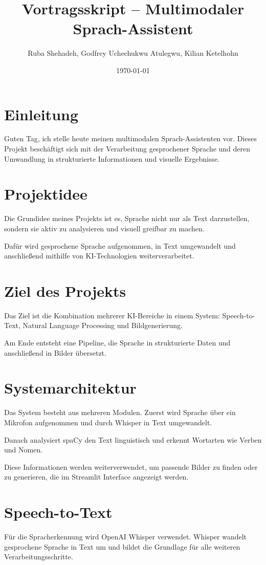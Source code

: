 \documentclass[a4paper,12pt]{article}
\title{Vortragsskript – Multimodaler Sprach-Assistent}
\author{Ruba Shehadeh, Godfrey Uchechukwu Atulegwu, Kilian Ketelhohn}
\date{\today}
\begin{document}
\maketitle

\section*{Einleitung}
Guten Tag, ich stelle heute meinen multimodalen Sprach-Assistenten vor. 
Dieses Projekt beschäftigt sich mit der Verarbeitung gesprochener Sprache und deren Umwandlung in strukturierte Informationen und visuelle Ergebnisse.

\section*{Projektidee}
Die Grundidee meines Projekts ist es, Sprache nicht nur als Text darzustellen, sondern sie aktiv zu analysieren und visuell greifbar zu machen. 

Dafür wird gesprochene Sprache aufgenommen, in Text umgewandelt und anschließend mithilfe von KI-Technologien weiterverarbeitet.

\section*{Ziel des Projekts}
Das Ziel ist die Kombination mehrerer KI-Bereiche in einem System: Speech-to-Text, Natural Language Processing und Bildgenerierung.

Am Ende entsteht eine Pipeline, die Sprache in strukturierte Daten und anschließend in Bilder übersetzt.

\section*{Systemarchitektur}
Das System besteht aus mehreren Modulen. Zuerst wird Sprache über ein Mikrofon aufgenommen und durch Whisper in Text umgewandelt.

Danach analysiert spaCy den Text linguistisch und erkennt Wortarten wie Verben und Nomen.

Diese Informationen werden weiterverwendet, um passende Bilder zu finden oder zu generieren, die im Streamlit Interface angezeigt werden.

\section*{Speech-to-Text}
Für die Spracherkennung wird OpenAI Whisper verwendet. 
Whisper wandelt gesprochene Sprache in Text um und bildet die Grundlage für alle weiteren Verarbeitungsschritte.
\end{document}

